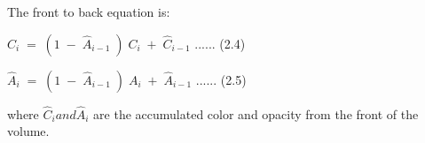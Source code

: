 The front to back equation is:

$ \hat{C}_i \; = \; (1 \; - \; \hat{A}_{i-1} \; ) \; C_i \; + \; \hat{C}_{i-1}  $ ...... (2.4)

$ \hat{A}_i \; = \; (1 \; - \; \hat{A}_{i-1} \; ) \; A_i \; + \; \hat{A}_{i-1}  $  ...... (2.5)

where $\hat{C}_i and \hat{A}_i$ are the accumulated color and opacity from the front of the volume. 

